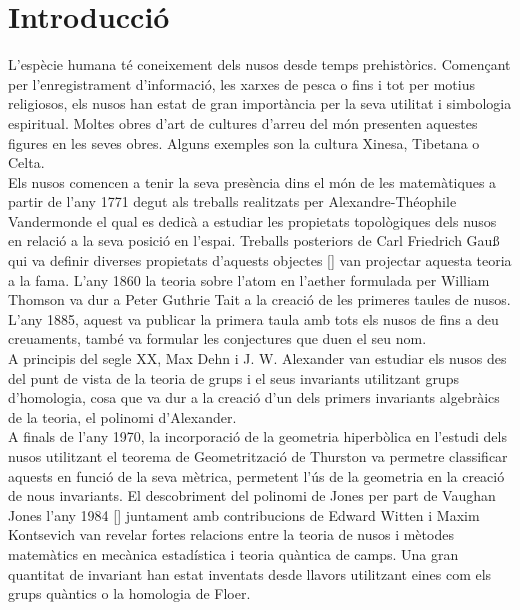 \renewcommand{\figurename}{Figura}
\renewcommand{\proofname}{Demostració}
\newtheorem{definition}{Definició}
\newtheorem{theorem}{Teorema}
\newtheorem{proposition}{Proposició}
\newtheorem{corolary}{Corol·lari}
\newtheorem{lemma}{Lema}

\section{Introducció}\label{sec:Introducció}
L'espècie humana té coneixement dels nusos desde temps prehistòrics. Començant per l'enregistrament d'informació, les xarxes de pesca o fins i tot per motius religiosos, els nusos han estat de gran importància per la seva utilitat i simbologia espiritual. Moltes obres d'art de cultures d'arreu del món presenten aquestes figures en les seves obres. Alguns exemples son la cultura Xinesa, Tibetana o Celta.\\

Els nusos comencen a tenir la seva presència dins el món de les matemàtiques a partir de l'any 1771 degut als treballs realitzats per Alexandre-Théophile Vandermonde el qual es dedicà a estudiar les propietats topològiques dels nusos en relació a la seva posició en l'espai. Treballs posteriors de Carl Friedrich Gau\ss$ $ qui va definir diverses propietats d'aquests objectes [\cite{knottheory}] van projectar aquesta teoria a la fama. L'any 1860 la teoria sobre l'atom en l'aether formulada per William Thomson va dur a Peter Guthrie Tait a la creació de les primeres taules de nusos. L'any 1885, aquest va publicar la primera taula amb tots els nusos de fins a deu creuaments, també va formular les conjectures que duen el seu nom.\\

A principis del segle XX, Max Dehn i J. W. Alexander van estudiar els nusos des del punt de vista de la teoria de grups i el seus invariants utilitzant grups d'homologia, cosa que va dur a la creació d'un dels primers invariants algebràics de la teoria, el polinomi d'Alexander.\\

A finals de l'any 1970, la incorporació de la geometria hiperbòlica en l'estudi dels nusos utilitzant el teorema de Geometrització de Thurston va permetre classificar aquests en funció de la seva mètrica, permetent l'ús de la geometria en la creació de nous invariants. El descobriment del polinomi de Jones per part de Vaughan Jones l'any 1984 [\cite{mathwithatwist}] juntament amb contribucions de Edward Witten i Maxim Kontsevich van revelar fortes relacions entre la teoria de nusos i mètodes matemàtics en mecànica estadística i teoria quàntica de camps. Una gran quantitat de invariant han estat inventats desde llavors utilitzant eines com els grups quàntics o la homologia de Floer.\\


